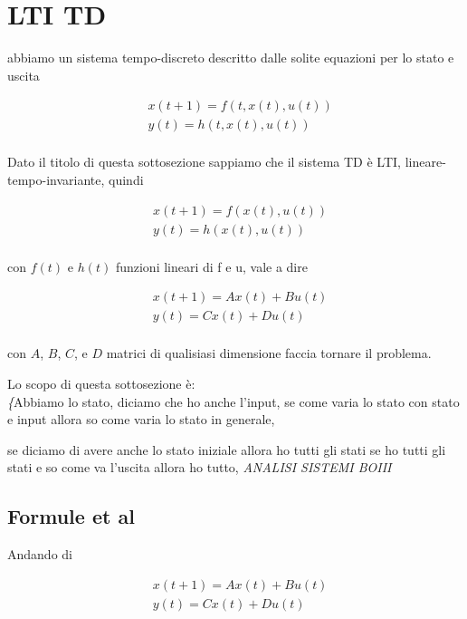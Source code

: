 \documentclass[11pt]{article}
\date{\today}
\title{}
\begin{document}
\tableofcontents


\section{LTI TD}
\label{sec:org651d966}

abbiamo un sistema tempo-discreto descritto dalle solite equazioni per
lo stato e uscita

\begin{align*}
&x(t+1) = f(t,x(t),u(t)) \\
&y(t) = h(t,x(t),u(t)) \\
\end{align*}

Dato il titolo di questa sottosezione sappiamo che il sistema TD è
LTI, lineare-tempo-invariante, quindi

\begin{align*}
&x(t+1) = f(x(t),u(t)) \\
&y(t) = h(x(t),u(t)) \\
\end{align*}

con \(f(t)\) e \(h(t)\) funzioni lineari di f e u, vale a dire

\begin{align*}
&x(t+1) = Ax(t) + Bu(t) \\
&y(t) = Cx(t) + Du(t) \\
\end{align*}

con \(A\), \(B\), \(C\), e \(D\) matrici di qualisiasi dimensione faccia
tornare il problema.

Lo scopo di questa sottosezione è: \\
\textit\{Abbiamo lo stato, diciamo che ho anche l'input, se come varia
lo stato con stato e input allora so come varia lo stato in generale,

se diciamo di avere anche lo stato iniziale allora ho tutti gli stati
se ho tutti gli stati e so come va l'uscita allora ho tutto,
\emph{ANALISI SISTEMI BOIII}

\subsection{Formule et al}
\label{sec:org83a3627}
Andando di

\begin{align*}
&x(t+1) = Ax(t) + Bu(t) \\
&y(t) = Cx(t) + Du(t) \\
\end{align*}
\end{document}
